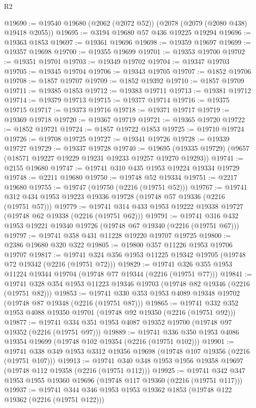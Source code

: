 \begin{lexlean}{R2}
\begin{coremodule}
@19690 := @19540 @19680 (@2062 (@2072 @52)) (@2078 (@2079 (@2080 @438) @19418 @2055))
@19695 := @3194 @19680 @57 @436 @19225 @19294
@19696 := @19363 @1853
@19697 := @19361 @19696
@19698 := @19359 @19697
@19699 := @19357 @19698
@19700 := @19355 @19699
@19701 := @19353 @19700
@19702 := @19351 @19701
@19703 := @19349 @19702
@19704 := @19347 @19703
@19705 := @19345 @19704
@19706 := @19343 @19705
@19707 := @1852 @19706
@19708 := @1857 @19707
@19709 := @1852 @19392
@19710 := @1857 @19709
@19711 := @19385 @1853
@19712 := @19383 @19711
@19713 := @19381 @19712
@19714 := @19379 @19713
@19715 := @19377 @19714
@19716 := @19375 @19715
@19717 := @19373 @19716
@19718 := @19371 @19717
@19719 := @19369 @19718
@19720 := @19367 @19719
@19721 := @19365 @19720
@19722 := @1852 @19721
@19724 := @1857 @19722 @1853
@19725 := @19710 @19724
@19726 := @19708 @19725
@19727 := @19341 @19726
@19728 := @19339 @19727
@19729 := @19337 @19728
@19740 := @19695 (@19335 @19729) (@9657 (@18571 @19227 @19229 @19231 @19233 @19257 @19270 @19293))
@19741 := @2155 @19680
@19747 := @19741 @310 @435 @1953 @19224 @19334 @19729
@19748 := @2211 @19680
@19750 := @19748 @52 @19334
@19751 := @2217 @19680
@19755 := @19747 (@19750 (@2216 (@19751 @52)))
@19767 := @19741 @312 @434 @1953 @19223 @19336 @19728 (@19748 @57 @19336 (@2216 (@19751 @57)))
@19779 := @19741 @314 @433 @1953 @19222 @19338 @19727 (@19748 @62 @19338 (@2216 (@19751 @62)))
@19791 := @19741 @316 @432 @1953 @19221 @19340 @19726 (@19748 @67 @19340 (@2216 (@19751 @67)))
@19797 := @19741 @358 @431 @11228 @19220 @19707 @19725
@19800 := @2386 @19680 @320 @322
@19805 := @19800 @357 @11226 @1953 @19706 @19707
@19817 := @19741 @324 @356 @1953 @11225 @19342 @19705 (@19748 @72 @19342 (@2216 (@19751 @72)))
@19829 := @19741 @326 @355 @1953 @11224 @19344 @19704 (@19748 @77 @19344 (@2216 (@19751 @77)))
@19841 := @19741 @328 @354 @1953 @11223 @19346 @19703 (@19748 @82 @19346 (@2216 (@19751 @82)))
@19853 := @19741 @330 @353 @1953 @4089 @19348 @19702 (@19748 @87 @19348 (@2216 (@19751 @87)))
@19865 := @19741 @332 @352 @1953 @4088 @19350 @19701 (@19748 @92 @19350 (@2216 (@19751 @92)))
@19877 := @19741 @334 @351 @1953 @4087 @19352 @19700 (@19748 @97 @19352 (@2216 (@19751 @97)))
@19889 := @19741 @336 @350 @1953 @4086 @19354 @19699 (@19748 @102 @19354 (@2216 (@19751 @102)))
@19901 := @19741 @338 @349 @1953 @3312 @19356 @19698 (@19748 @107 @19356 (@2216 (@19751 @107)))
@19913 := @19741 @340 @348 @1953 @1956 @19358 @19697 (@19748 @112 @19358 (@2216 (@19751 @112)))
@19925 := @19741 @342 @347 @1953 @1955 @19360 @19696 (@19748 @117 @19360 (@2216 (@19751 @117)))
@19937 := @19741 @344 @346 @1953 @1953 @19362 @1853 (@19748 @122 @19362 (@2216 (@19751 @122)))

\end{coremodule}
\end{lexlean}
